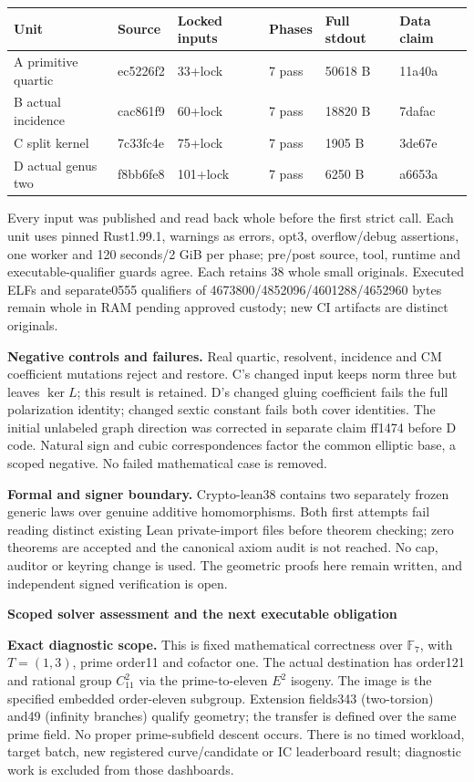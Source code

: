 \documentclass[10pt,a4paper]{article}
\begin{document}
\begin{center}\small
\begin{tabular}{llllll}
\toprule
Unit & Source & Locked inputs & Phases & Full stdout & Data claim\\
\midrule
A primitive quartic & ec5226f2 & 33+lock & 7 pass & 50618 B & 11a40a\\
B actual incidence & cac861f9 & 60+lock & 7 pass & 18820 B & 7dafac\\
C split kernel & 7c33fc4e & 75+lock & 7 pass & 1905 B & 3de67e\\
D actual genus two & f8bb6fe8 & 101+lock & 7 pass & 6250 B & a6653a\\
\bottomrule
\end{tabular}\end{center}
Every input was published and read back whole before the first strict
call. Each unit uses pinned Rust1.99.1, warnings as errors, opt3,
overflow/debug assertions, one worker and 120 seconds/2 GiB per phase;
pre/post source, tool, runtime and executable-qualifier guards agree.
Each retains 38 whole small originals. Executed ELFs and separate0555
qualifiers of 4673800/4852096/4601288/4652960 bytes remain whole in RAM
pending approved custody; new CI artifacts are distinct originals.

\textbf{Negative controls and failures.} Real quartic, resolvent,
incidence and CM coefficient mutations reject and restore. C's changed
input keeps norm three but leaves $\ker L$; this result is retained.
D's changed gluing coefficient fails the full polarization identity;
changed sextic constant fails both cover identities. The initial
unlabeled graph direction was corrected in separate claim ff1474 before
D code. Natural sign and cubic correspondences factor the common
elliptic base, a scoped negative. No failed mathematical case is removed.

\textbf{Formal and signer boundary.} Crypto-lean38 contains two separately
frozen generic laws over genuine additive homomorphisms. Both first
attempts fail reading distinct existing Lean private-import files before
theorem checking; zero theorems are accepted and the canonical axiom audit
is not reached. No cap, auditor or keyring change is used. The geometric
proofs here remain written, and independent signed verification is open.

\newpage
{\Large\bfseries Scoped solver assessment and the next executable obligation}\par

\textbf{Exact diagnostic scope.} This is fixed mathematical correctness
over $\mathbb F_7$, with $T=(1,3)$, prime order11 and cofactor one.
The actual destination has order121 and rational group $C_{11}^2$ via
the prime-to-eleven $E^2$ isogeny. The image is the specified embedded
order-eleven subgroup. Extension fields343 (two-torsion) and49
(infinity branches) qualify geometry; the transfer is defined over the
same prime field. No proper prime-subfield descent occurs. There is no
timed workload, target batch, new registered curve/candidate or IC
leaderboard result; diagnostic work is excluded from those dashboards.
\end{document}
